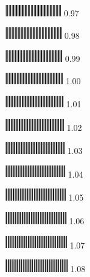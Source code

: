 \documentclass{article}
\begin{document}
\includegraphics[width=0.97in]{bw_interlaced_horizontal.png} 0.97

\includegraphics[width=0.98in]{bw_interlaced_horizontal.png} 0.98

\includegraphics[width=0.99in]{bw_interlaced_horizontal.png} 0.99

\includegraphics[width=1.00in]{bw_interlaced_horizontal.png} 1.00


\includegraphics[width=1.01in]{bw_interlaced_horizontal.png} 1.01

\includegraphics[width=1.02in]{bw_interlaced_horizontal.png} 1.02

\includegraphics[width=1.03in]{bw_interlaced_horizontal.png} 1.03

\includegraphics[width=1.04in]{bw_interlaced_horizontal.png} 1.04

\includegraphics[width=1.05in]{bw_interlaced_horizontal.png} 1.05

\includegraphics[width=1.06in]{bw_interlaced_horizontal.png} 1.06

\includegraphics[width=1.07in]{bw_interlaced_horizontal.png} 1.07

\includegraphics[width=1.08in]{bw_interlaced_horizontal.png} 1.08
\end{document}
